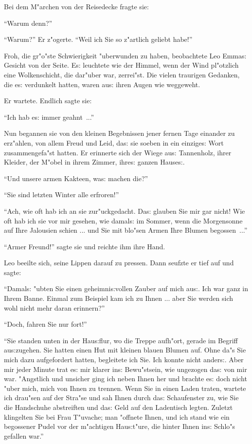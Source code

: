 \documentclass[oneside,12pt]{book}
\newcommand{\s}{s:}%
\begin{document}
Bei dem M"archen von der Reisedecke fragte sie:

"`Warum denn?"'

"`Warum?"' Er z"ogerte. "`Weil ich Sie so z"artlich geliebt habe!"'

Froh, die gr"o"ste Schwierigkeit "uberwunden zu haben, beobachtete
Leo Emma{\s} Gesicht von der Seite. E{\s} leuchtete wie der
Himmel, wenn der Wind pl"otzlich eine Wolkenschicht, die dar"uber
war, zerrei"st. Die vielen traurigen Gedanken, die e{\s}
verdunkelt hatten, waren au{\s} ihren Augen wie weggeweht.

Er wartete. Endlich sagte sie:

"`Ich hab e{\s} immer geahnt~..."'

Nun begannen sie von den kleinen Begebnissen jener fernen Tage
einander zu erz"ahlen, von allem Freud und Leid, da{\s} sie soeben
in ein einzige{\s} Wort zusammengefa"st hatten. Er erinnerte sich
der Wiege au{\s} Tannenholz, ihrer Kleider, der M"obel in ihrem
Zimmer, ihre{\s} ganzen Hause{\s}.

"`Und unsere armen Kakteen, wa{\s} machen die?"'

"`Sie sind letzten Winter alle erfroren!"'

"`Ach, wie oft hab ich an sie zur"uckgedacht. Da{\s} glauben Sie
mir gar nicht! Wie oft hab ich sie vor mir gesehen, wie damal{\s}
im Sommer, wenn die Morgensonne auf Ihre Jalousien schien ... und
Sie mit blo"sen Armen Ihre Blumen begossen~..."'

"`Armer Freund!"' sagte sie und reichte ihm ihre Hand.

Leo beeilte sich, seine Lippen darauf zu pressen. Dann seufzte er
tief auf und sagte:

"`Damal{\s} "ubten Sie einen geheimni{\s}vollen Zauber auf mich
au{\s}. Ich war ganz in Ihrem Banne. Einmal zum Beispiel kam ich
zu Ihnen ... aber Sie werden sich wohl nicht mehr daran
erinnern?"'

"`Doch, fahren Sie nur fort!"'

"`Sie standen unten in der Hau{\s}flur, wo die Treppe aufh"ort,
gerade im Begriff au{\s}zugehen. Sie hatten einen Hut mit kleinen
blauen Blumen auf. Ohne da"s Sie mich dazu aufgefordert hatten,
begleitete ich Sie. Ich konnte nicht ander{\s}. Aber mir jeder
Minute trat e{\s} mir klarer in{\s} Bewu"stsein, wie ungezogen
da{\s} von mir war. "Angstlich und unsicher ging ich neben Ihnen
her und brachte e{\s} doch nicht "uber mich, mich von Ihnen zu
trennen. Wenn Sie in einen Laden traten, wartete ich drau"sen auf
der Stra"se und sah Ihnen durch da{\s} Schaufenster zu, wie Sie
die Handschuhe abstreiften und da{\s} Geld auf den Ladentisch
legten. Zuletzt klingelten Sie bei Frau T"uvache; man "offnete
Ihnen, und ich stand wie ein begossener Pudel vor der m"achtigen
Hau{\s}t"ure, die hinter Ihnen in{\s} Schlo"s gefallen war."'
\end{document}
